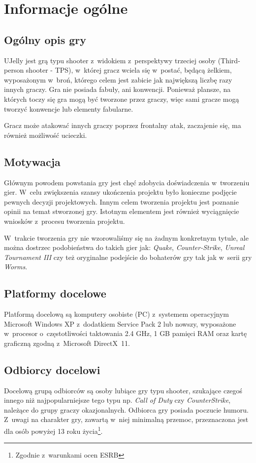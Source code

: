 \chapter{Informacje ogólne}

\section{Ogólny opis gry}
UJelly jest grą typu shooter z~widokiem z~perspektywy trzeciej osoby (Third-person shooter - TPS), w~której gracz wciela się w~postać, będącą żelkiem, wyposażonym w~broń, którego celem jest zabicie jak największą liczbę razy innych graczy. Gra nie posiada fabuły, ani konwencji. Ponieważ plansze, na których toczy się gra mogą być tworzone przez graczy, więc sami gracze mogą tworzyć konwencje lub elementy fabularne.

Gracz może atakować innych graczy poprzez frontalny atak, zaczajenie się, ma również możliwość ucieczki.

\section{Motywacja}
Głównym powodem powstania gry jest chęć zdobycia doświadczenia w~tworzeniu gier. W~celu zwiększenia szansy ukończenia projektu było konieczne podjęcie pewnych decyzji projektowych. Innym celem tworzenia projektu jest poznanie opinii na temat stworzonej gry. Istotnym elementem jest również wyciągnięcie wniosków z~procesu tworzenia projektu.

W~trakcie tworzenia gry nie wzorowaliśmy się na żadnym konkretnym tytule, ale można dostrzec podobieństwa do takich gier jak: \textit{Quake}, \textit{Counter-Strike}, \textit{Unreal Tournament III} czy też oryginalne podejście do bohaterów gry tak jak w~serii gry \textit{Worms}.

\section{Platformy docelowe}
Platformą docelową są komputery osobiste (PC) z~systemem operacyjnym Microsoft Windows XP z~dodatkiem Service Pack 2 lub nowszy, wyposażone w~procesor o~częstotliwości taktowania 2.4 GHz, 1 GB pamięci RAM oraz kartę graficzną zgodną z~Microsoft DirectX~11.

\section{Odbiorcy docelowi}
Docelową grupą odbiorców są osoby lubiące gry typu shooter, szukające czegoś innego niż najpopularniejsze tego typu np. \textit{Call of Duty} czy \textit{CounterStrike}, należące do grupy graczy okazjonalnych. Odbiorca gry posiada poczucie humoru. Z~uwagi na charakter gry, zawartą w~niej minimalną przemoc, przeznaczona jest dla osób powyżej 13 roku życia\footnote{Zgodnie z~warunkami ocen ESRB}.

